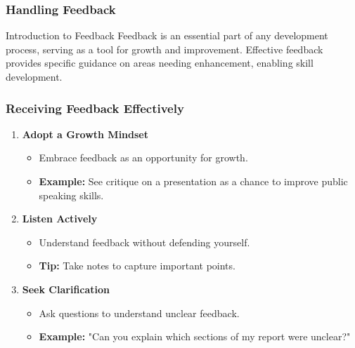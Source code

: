 \documentclass{beamer}
\begin{document}
\begin{frame}[fragile]
    \frametitle{Handling Feedback}
    \begin{block}{Introduction to Feedback}
        Feedback is an essential part of any development process, serving as a tool for growth and improvement. Effective feedback provides specific guidance on areas needing enhancement, enabling skill development.
    \end{block}
\end{frame}

\begin{frame}[fragile]
    \frametitle{Receiving Feedback Effectively}
    \begin{enumerate}
        \item \textbf{Adopt a Growth Mindset}
            \begin{itemize}
                \item Embrace feedback as an opportunity for growth.
                \item \textbf{Example:} See critique on a presentation as a chance to improve public speaking skills.
            \end{itemize}
        
        \item \textbf{Listen Actively}
            \begin{itemize}
                \item Understand feedback without defending yourself.
                \item \textbf{Tip:} Take notes to capture important points.
            \end{itemize}
        
        \item \textbf{Seek Clarification}
            \begin{itemize}
                \item Ask questions to understand unclear feedback.
                \item \textbf{Example:} "Can you explain which sections of my report were unclear?"
            \end{itemize}
    \end{enumerate}
\end{frame}
\end{document}
